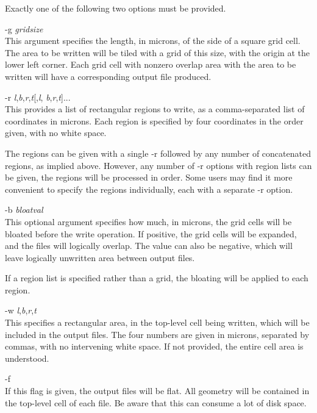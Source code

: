Exactly one of the following two options must be provided.

\begin{description}
\item{\vt -g} {\it gridsize}\\
This argument specifies the length, in microns, of the side of a
square grid cell.  The area to be written will be tiled with a grid of
this size, with the origin at the lower left corner.  Each grid cell
with nonzero overlap area with the area to be written will have a
corresponding output file produced.

\item{\vt -r} {\it l\/},{\it b\/},{\it r\/},{\it t\/}[,{\it l\/},{\it
 b\/},{\it r\/},{\it t\/}]...\\
This provides a list of rectangular regions to write, as a
comma-separated list of coordinates in microns.  Each region is
specified by four coordinates in the order given, with no white space.

The regions can be given with a single {\vt -r} followed by any number
of concatenated regions, as implied above.  However, any number of
{\vt -r} options with region lists can be given, the regions will be
processed in order.  Some users may find it more convenient to specify
the regions individually, each with a separate {\vt -r} option.

\item{\vt -b} {\it bloatval}\\
This optional argument specifies how much, in microns, the grid cells
will be bloated before the write operation.  If positive, the grid
cells will be expanded, and the files will logically overlap.  The
value can also be negative, which will leave logically unwritten area
between output files.

If a region list is specified rather than a grid, the bloating will be
applied to each region.

\item{\vt -w} {\it l\/},{\it b\/},{\it r\/},{\it t\/}\\
This specifies a rectangular area, in the top-level cell being
written, which will be included in the output files.  The four numbers
are given in microns, separated by commas, with no intervening white
space.  If not provided, the entire cell area is understood.

\item{\vt -f}\\
If this flag is given, the output files will be flat.  All geometry
will be contained in the top-level cell of each file.  Be aware that
this can consume a lot of disk space.


\end{description}
